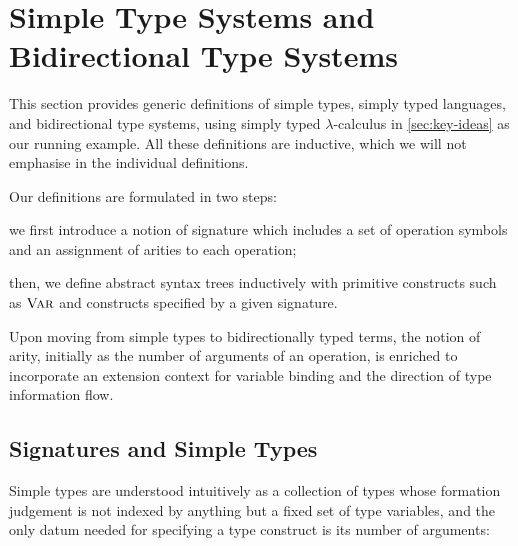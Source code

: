 
\section{Simple Type Systems and Bidirectional Type Systems}\label{sec:defs}
This section provides generic definitions
of simple types, simply typed languages, and bidirectional type systems, using simply typed $\lambda$-calculus in \cref{sec:key-ideas} as our running example.
All these definitions are inductive, which we will not emphasise in the individual definitions.

Our definitions are formulated in two steps:
\begin{enumerate*}
\item we first introduce a notion of signature which includes a set of operation symbols and an assignment of arities to each operation;
\item then, we define abstract syntax trees inductively with primitive constructs such as $\textnormal{\textsc{Var}}$ and constructs specified by a given signature.
\end{enumerate*}
Upon moving from simple types to bidirectionally typed terms, the notion of arity, initially as the number of arguments of an operation, is enriched to incorporate an extension context for variable binding and the direction of type information flow.

\subsection{Signatures and Simple Types} \label{subsec:simple-types}
Simple types are understood intuitively as a collection of types whose formation judgement is not indexed by anything but a fixed set of type variables, and the only datum needed for specifying a type construct is its number of arguments:

